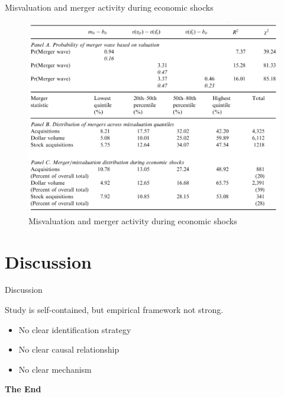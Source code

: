 \documentclass[aspectratio=169,xcolor=dvipsnames]{beamer}
\begin{document}
\begin{frame}{Misvaluation and merger activity during economic shocks}
    \begin{figure}
        \includegraphics[width=0.7\linewidth]{figures/p2_table13.png}
        \caption{Misvaluation and merger activity during economic shocks}
    \end{figure}
\end{frame}


\section{Discussion}

\begin{frame}{Discussion}
    \begin{block}{Study is self-contained, but empirical framework not strong.}
        \begin{itemize}
            \item No clear identification strategy
            \item No clear causal relationship
            \item No clear mechanism
        \end{itemize}
    \end{block}
\end{frame}


\begin{frame}
    \Huge{\centerline{\textbf{The End}}}
\end{frame}
\end{document}
